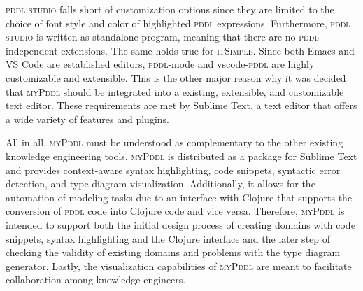 \documentclass[runningheads]{llncs}
\newcommand{\mypddl}{\textsc{myPddl}\xspace}
\newcommand{\pddlstudio}{\textsc{pddl studio}\xspace}
\newcommand{\itsimple}{\textsc{itSimple}\xspace}
\newcommand{\pddlmode}{\textsc{pddl}-mode\xspace}
\newcommand{\vscode}{vscode-\textsc{pddl}\xspace}
\newcommand{\pddl}{\textsc{pddl}\xspace}
\begin{document}
\pddlstudio falls short of customization options since they are
limited to the choice of font style and color of highlighted \pddl
expressions. Furthermore, \pddlstudio is written as standalone
program, meaning that there are no \pddl-independent extensions. The
same holds true for \itsimple. Since both Emacs and VS Code are
established editors, \pddlmode and \vscode are highly customizable and
extensible. This is the other major reason why it was decided that
\mypddl should be integrated into a existing, extensible, and
customizable text editor. These requirements are met by Sublime Text,
a text editor that offers a wide variety of features and plugins.

All in all, \mypddl must be understood as complementary to the other
existing knowledge engineering tools. \mypddl is distributed as a
package for Sublime Text and provides context-aware syntax
highlighting, code snippets, syntactic error detection, and type
diagram visualization. Additionally, it allows for the automation of
modeling tasks due to an interface with Clojure that supports the
conversion of \textsc{pddl} code into Clojure code and vice
versa. Therefore, \mypddl is intended to support both the initial
design process of creating domains with code snippets, syntax
highlighting and the Clojure interface and the later step of checking
the validity of existing domains and problems with the type diagram
generator. Lastly, the visualization capabilities of \mypddl are meant
to facilitate collaboration among knowledge engineers.
\end{document}
